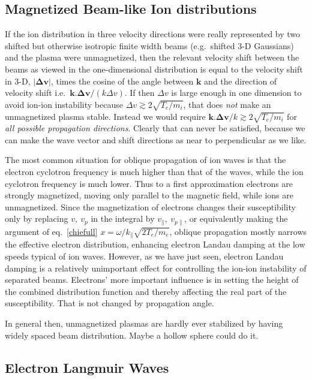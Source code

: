\documentclass[12pt]{article}
\begin{document}
\subsection{Magnetized Beam-like Ion distributions}
If the ion distribution in three velocity directions were really
represented by two shifted but otherwise isotropic finite width beams
(e.g.\ shifted 3-D Gaussians) and the plasma were unmagnetized, then
the relevant velocity shift between the beams as viewed in the
one-dimensional distribution is equal to the velocity shift in 3-D,
$|\bm{\Delta v}|$, times the cosine of the angle between $\bm k$ and
the direction of velocity shift i.e.\
$\bm k.\bm{\Delta v}/(k\Delta v)$. If then $\Delta v$ is large enough
in one dimension to avoid ion-ion instability because
$\Delta v \gtrsim 2\sqrt{T_e/m_i}$, that does \emph{not} make an unmagnetized
plasma stable. Instead we would require
$\bm{k.\Delta v}/k \gtrsim 2\sqrt{T_e/m_i}$ for \emph{all possible
  propagation directions}. Clearly that can never be satisfied,
because we can make the wave vector and shift directions as near to
perpendicular as we like. 

The most common situation for oblique propagation of ion waves is that
the electron cyclotron frequency is much higher than that of the
waves, while the ion cyclotron frequency is much lower. Thus to a
first approximation electrons are strongly magnetized, moving only
parallel to the magnetic field, while ions are unmagnetized. Since the
magnetization of electrons changes their susceptibility only by
replacing $v,\ v_p$ in the integral by $v_\parallel,\ v_{p\parallel}$,
or equivalently making the argument of eq.\ \ref{chiefull}
$x=\omega/k_\parallel \sqrt{2T_e/m_e}$, oblique propagation mostly
narrows the effective electron distribution, enhancing electron Landau
damping at the low speeds typical of ion waves. However, as we have
just seen, electron Landau damping is a relatively unimportant effect
for controlling the ion-ion instability of separated beams. Electrons'
more important influence is in setting the height of the combined
distribution function and thereby affecting the real part of the
susceptibility. That is not changed by propagation angle.

In general then, unmagnetized plasmas are hardly ever stabilized by
having widely spaced beam distribution. Maybe a hollow sphere could do it. 




\subsection{Electron Langmuir Waves}
\label{elecLang}
\end{document}
